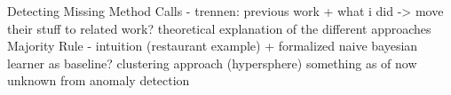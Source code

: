 
Detecting Missing Method Calls - trennen: previous work + what i did -> move their stuff to related work?
	theoretical explanation of the different approaches
	Majority Rule - intuition (restaurant example) + formalized 
	naive bayesian learner as baseline?
	clustering approach (hypersphere)
	something as of now unknown from anomaly detection
